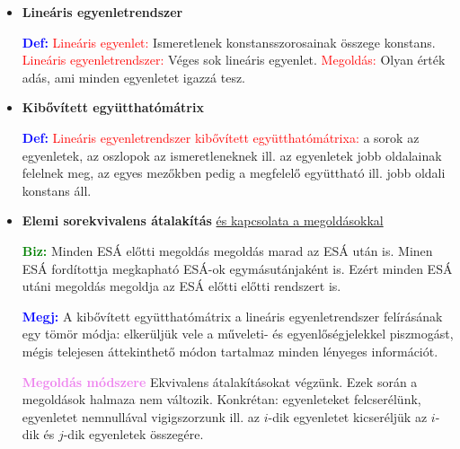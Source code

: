 \documentclass[../../szobeli.tex]{subfiles}
\begin{document}
\begin{center}
    \noindent{}
\end{center}

    \begin{itemize}
        \item \textbf{Lineáris egyenletrendszer}
        
            \textcolor{blue}{\textbf{Def:}} \textcolor{red}{Lineáris egyenlet:} Ismeretlenek konstansszorosainak összege konstans. \textcolor{red}{Lineáris egyenletrendszer:} Véges sok lineáris egyenlet. \textcolor{red}{Megoldás:} Olyan érték adás, ami minden egyenletet igazzá tesz.

        \item \textbf{Kibővített együtthatómátrix} 
        
            \textcolor{blue}{\textbf{Def:}} \textcolor{red}{Lineáris egyenletrendszer kibővített együtthatómátrixa:} a sorok az egyenletek, az oszlopok az ismeretleneknek ill. az egyenletek jobb oldalainak felelnek meg, az egyes mezőkben pedig a megfelelő együttható ill. jobb oldali konstans áll. 
            
        \item \textbf{Elemi sorekvivalens átalakítás} \underline{és kapcsolata a megoldásokkal} 
        
            \textcolor{green}{\textbf{Biz:}} Minden ESÁ előtti megoldás megoldás marad az ESÁ után is. Minen ESÁ fordítottja megkapható ESÁ-ok egymásutánjaként is. Ezért minden ESÁ utáni megoldás megoldja az ESÁ előtti előtti rendszert is. 

            \textcolor{blue}{\textbf{Megj:}} A kibővített együtthatómátrix a lineáris egyenletrendszer felírásának egy tömör módja: elkerüljük vele a műveleti- és egyenlőségjelekkel piszmogást, mégis telejesen áttekinthető módon tartalmaz minden lényeges információt.

            \textcolor{violet}{\textbf{Megoldás módszere}} Ekvivalens átalakításokat végzünk. Ezek során a megoldások halmaza nem változik. Konkrétan: egyenleteket felcserélünk, egyenletet nemnullával vigigszorzunk ill. az $i$-dik egyenletet kicseréljük az $i$-dik és $j$-dik egyenletek összegére.
            

\end{itemize}
\end{document}

